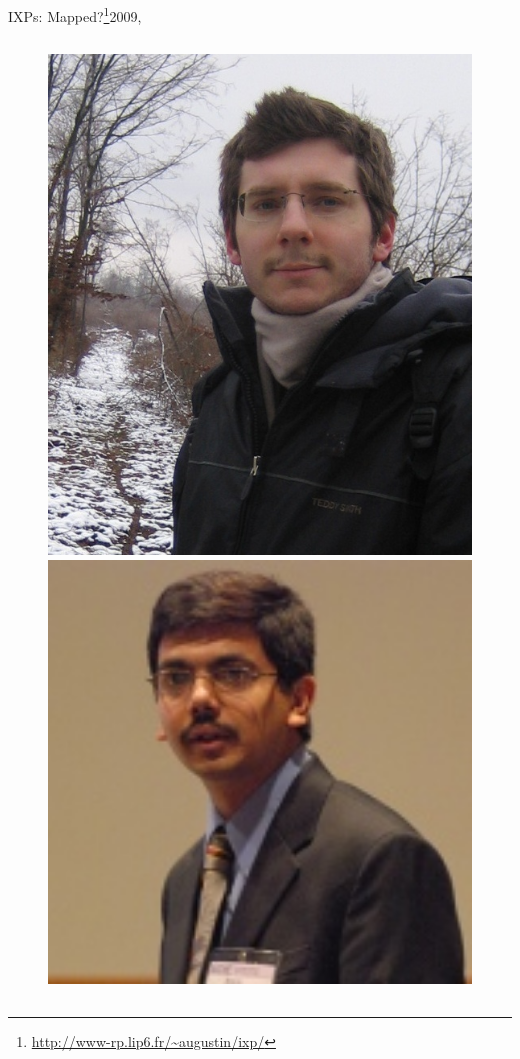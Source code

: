 \documentclass[ngerman,compress,hyperref={bookmarks}]{beamer}
\begin{document}
\begin{frame}{IXPs: Mapped?\footnote{\url{http://www-rp.lip6.fr/~augustin/ixp/}}}{2009, \cite{Augustin:2009:IM:1644893.1644934}}
\begin{columns}[c]
\begin{column}{0.1\textwidth}
\begin{figure}
        \includegraphics[width=1\textwidth]{images/augustin_b}\\
        \includegraphics[width=1\textwidth]{images/krishnamurthy_b}\\

\end{figure}
\end{column}
\end{columns}
\end{frame}
\end{document}
